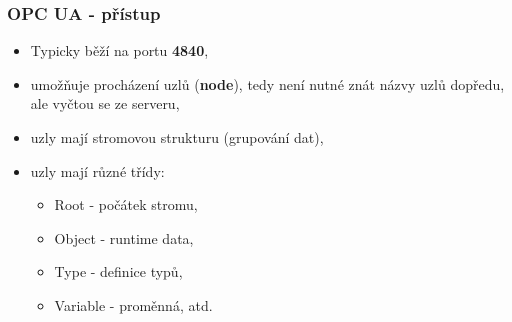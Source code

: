 	\begin{frame}
    \frametitle{OPC UA - přístup}
		
		\begin{itemize}
			\item Typicky běží na portu \textbf{4840},
			\item umožňuje procházení uzlů (\textbf{node}), tedy není nutné znát názvy uzlů dopředu, ale vyčtou se ze serveru,
			\item uzly mají stromovou strukturu (grupování dat),
			\item uzly mají různé třídy:
			
			\begin{itemize}
				\item Root - počátek stromu,
				\item Object - runtime data,
				\item Type - definice typů,
				\item Variable - proměnná, atd.
			\end{itemize}
		\end{itemize}
		 
	\end{frame}
	
